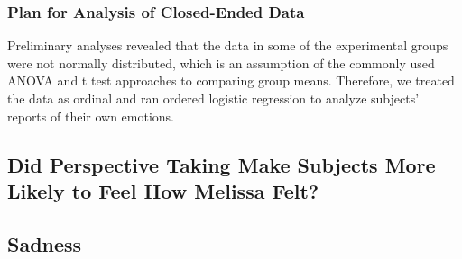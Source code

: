 \documentclass[man,a4paper,noextraspace,apacite]{apa6}\usepackage[]{graphicx}\usepackage[]{color}
\begin{document}
\subsubsection{Plan for Analysis of Closed-Ended Data} Preliminary analyses revealed that the data in some of the experimental groups were not normally distributed, which is an assumption of the commonly used ANOVA and t test approaches to comparing group means. Therefore, we treated the data as ordinal and ran ordered logistic regression to analyze subjects' reports of their own emotions.


\subsection{Did Perspective Taking Make Subjects More Likely to Feel How Melissa Felt?}

\subsection{Sadness} 
\end{document}
